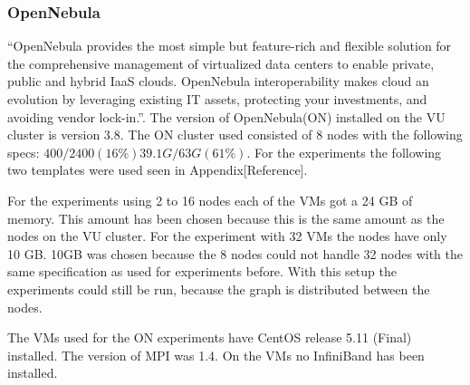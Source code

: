 \subsubsection{OpenNebula}
\label{hw:opennebula}
``OpenNebula  provides the most simple but feature-rich and flexible solution for the comprehensive management of virtualized data centers to enable private, public and hybrid IaaS clouds. OpenNebula interoperability makes cloud an evolution by leveraging existing IT assets, protecting your investments, and avoiding vendor lock-in.''\cite{opennebula}. The version of OpenNebula(ON) installed on the VU cluster is version 3.8. The ON cluster used consisted of 8 nodes with the following specs: $400 / 2400 (16\%)  39.1G / 63G (61\%)$. For the experiments the following two templates were used seen in Appendix[Reference].

For the experiments using 2 to 16 nodes each of the VMs got a 24 GB of memory. This amount has been chosen because this is the same amount as the nodes on the VU cluster. For the experiment with 32 VMs the nodes have only 10 GB. 10GB was chosen because the 8 nodes could not handle 32 nodes with the same specification as used for experiments before. With this setup the experiments could still be run, because the graph is distributed between the nodes. 

The VMs used for the ON experiments have CentOS release 5.11 (Final) installed. The version of MPI was 1.4. On the VMs no InfiniBand has been installed. 

